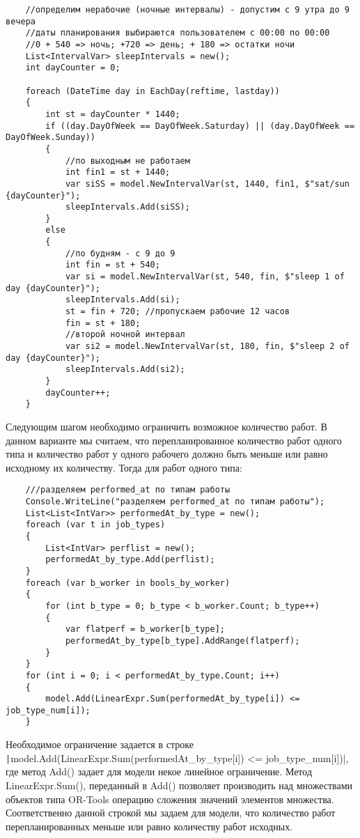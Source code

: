 \begin{verbatim}
    //определим нерабочие (ночные интервалы) - допустим с 9 утра до 9 вечера
    //даты планирования выбираются пользователем с 00:00 по 00:00
    //0 + 540 => ночь; +720 => день; + 180 => остатки ночи
    List<IntervalVar> sleepIntervals = new();
    int dayCounter = 0;
    
    foreach (DateTime day in EachDay(reftime, lastday))
    {   
        int st = dayCounter * 1440;
        if ((day.DayOfWeek == DayOfWeek.Saturday) || (day.DayOfWeek == DayOfWeek.Sunday))
        {
            //по выходным не работаем
            int fin1 = st + 1440;
            var siSS = model.NewIntervalVar(st, 1440, fin1, $"sat/sun {dayCounter}");
            sleepIntervals.Add(siSS);
        }
        else
        {
            //по будням - с 9 до 9
            int fin = st + 540;
            var si = model.NewIntervalVar(st, 540, fin, $"sleep 1 of day {dayCounter}");
            sleepIntervals.Add(si);
            st = fin + 720; //пропускаем рабочие 12 часов
            fin = st + 180;
            //второй ночной интервал
            var si2 = model.NewIntervalVar(st, 180, fin, $"sleep 2 of day {dayCounter}");
            sleepIntervals.Add(si2);
        }    
        dayCounter++;
    }
\end{verbatim}

Следующим шагом необходимо ограничить возможное количество работ. В данном варианте мы считаем, что перепланированное количество работ одного типа и количество работ у одного рабочего должно быть меньше или равно исходному их количеству. Тогда для работ одного типа:

\begin{verbatim}
    ///разделяем performed_at по типам работы
    Console.WriteLine("разделяем performed_at по типам работы");
    List<List<IntVar>> performedAt_by_type = new();
    foreach (var t in job_types)
    {
        List<IntVar> perflist = new();
        performedAt_by_type.Add(perflist);
    }
    foreach (var b_worker in bools_by_worker)
    {
        for (int b_type = 0; b_type < b_worker.Count; b_type++)
        {
            var flatperf = b_worker[b_type];
            performedAt_by_type[b_type].AddRange(flatperf);
        }
    }
    for (int i = 0; i < performedAt_by_type.Count; i++)
    {
        model.Add(LinearExpr.Sum(performedAt_by_type[i]) <= job_type_num[i]);
    }
\end{verbatim}

Необходимое ограничение задается в строке \texttt|model.Add(LinearExpr.Sum(performedAt_by_type[i]) <= job_type_num[i])|, где метод Add() задает для модели некое линейное ограничение. Метод LinearExpr.Sum(), переданный в Add() позволяет производить над множествами объектов типа OR-Tools операцию сложения значений элементов множества. Соответственно данной строкой мы задаем для модели, что количество работ перепланированных меньше или равно количеству работ исходных.

